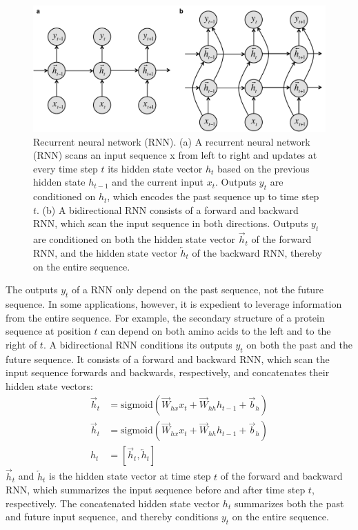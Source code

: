 \begin{figure}[htbp!]
\centering
\includegraphics[width=1.0\textwidth]{rnn}
\caption[Recurrent neural network (RNN).]{Recurrent neural network (RNN). (a) A recurrent neural network (RNN) scans an input sequence x from left to right and updates at every time step $t$ its hidden state vector $h_t$ based on the previous hidden state $h_{t-1}$ and the current input $x_t$. Outputs $y_t$ are conditioned on $h_t$, which encodes the past sequence up to time step $t$. (b) A bidirectional RNN consists of a forward and backward RNN, which scan the input sequence in both directions. Outputs $y_t$ are conditioned on both the hidden state vector $\overrightarrow{h}_t$ of the forward RNN, and the hidden state vector $\overleftarrow{h}_t$ of the backward RNN, thereby on the entire sequence.}
\label{fig:rnn}
\end{figure}

The outputs $y_t$ of a RNN only depend on the past sequence, not the future sequence. In some applications, however, it is expedient to leverage information from the entire sequence. For example, the secondary structure of a protein sequence at position $t$ can depend on both amino acids to the left and to the right of $t$. A bidirectional RNN conditions its outputs $y_t$ on both the past and the future sequence. It consists of a forward and backward RNN, which scan the input sequence forwards and backwards, respectively, and concatenates their hidden state vectors:
\begin{align}
  \overrightarrow{h}_t&=\textrm{sigmoid}(\overrightarrow{W}_{hx}x_t+\overrightarrow{W}_{hh}h_{t-1}+\overrightarrow{b}_h) \\
  \overrightarrow{h}_t&=\textrm{sigmoid}(\overrightarrow{W}_{hx}x_t+\overrightarrow{W}_{hh}h_{t-1}+\overrightarrow{b}_h) \\
  h_t&=[\overrightarrow{h}_t, \overleftarrow{h}_t]
\end{align}
$\overrightarrow{h}_t$ and $\overleftarrow{h}_t$ is the hidden state vector at time step $t$ of the forward and backward RNN, which summarizes the input sequence before and after time step $t$, respectively. The concatenated hidden state vector $h_t$ summarizes both the past and future input sequence, and thereby conditions $y_t$ on the entire sequence.


